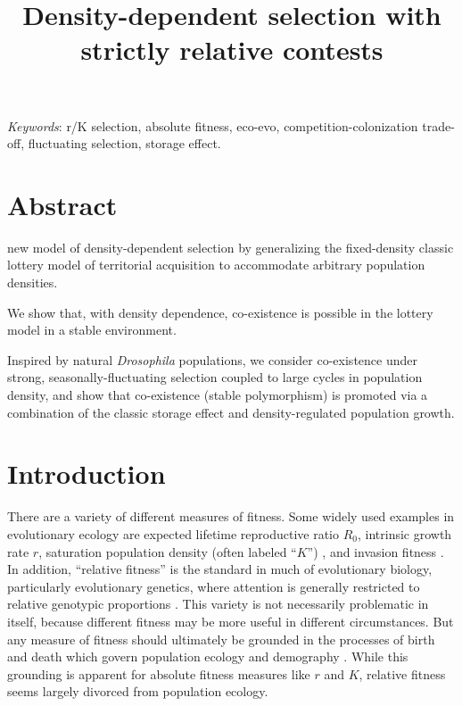 \documentclass[11pt]{article}
\title{Density-dependent selection with strictly relative contests}
\date{}
\begin{document}
\maketitle




\bigskip


\bigskip

\textit{Keywords}: r/K selection, absolute fitness, eco-evo, competition-colonization trade-off, fluctuating selection, storage effect.

\bigskip


\linenumbers{}
\modulolinenumbers[1]

\newpage{}

\section*{Abstract}


new model of density-dependent selection by generalizing the fixed-density classic lottery model of territorial acquisition to accommodate arbitrary population densities. 

We show that, with density dependence, co-existence is possible in the lottery model in a stable environment. 

Inspired by natural \textit{Drosophila} populations, we consider co-existence under strong, seasonally-fluctuating selection coupled to large cycles in population density, and show that co-existence (stable polymorphism) is promoted via a combination of the classic storage effect and density-regulated population growth. 

\newpage{}


\section*{Introduction}

There are a variety of different measures of fitness. Some widely used examples in evolutionary ecology are expected lifetime reproductive ratio $R_0$, intrinsic growth rate $r$, saturation population density (often labeled ``$K$'') \citep{benton_2000}, and invasion fitness \citep{metz_1992}. In addition, ``relative fitness'' is the standard in much of evolutionary biology, particularly evolutionary genetics, where attention is generally restricted to relative genotypic proportions \cite[pp. 468]{barton_2007}. This variety is not necessarily problematic in itself, because different fitness may be more useful in different circumstances. But any measure of fitness should ultimately be grounded in the processes of birth and death which govern population ecology and demography \citep{metcalf_2007,doebeli_2017}. While this grounding is apparent for absolute fitness measures like $r$ and $K$, relative fitness seems largely divorced from population ecology.
\end{document}
